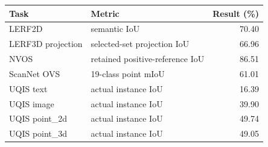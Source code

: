 \begin{tabular}{llr}
\toprule
Task & Metric & Result (\%) \\
\midrule
LERF2D & semantic IoU & 70.40 \\
LERF3D projection & selected-set projection IoU & 66.96 \\
NVOS & retained positive-reference IoU & 86.51 \\
ScanNet OVS & 19-class point mIoU & 61.01 \\
UQIS text & actual instance IoU & 16.39 \\
UQIS image & actual instance IoU & 39.90 \\
UQIS point\_2d & actual instance IoU & 49.74 \\
UQIS point\_3d & actual instance IoU & 49.05 \\
\bottomrule
\end{tabular}
